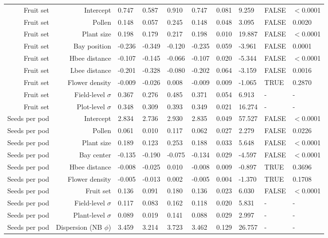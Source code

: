 \begin{landscape}
\begin{longtable}{|r|r|l|l|l|l|l|l|l|l|}
    \hline
    Fruit set & Intercept & 0.747 & 0.587 & 0.910 & 0.747 & 0.081 & 9.259 & FALSE & $<$0.0001 \\ 
    Fruit set & Pollen & 0.148 & 0.057 & 0.245 & 0.148 & 0.048 & 3.095 & FALSE & 0.0020 \\ 
    Fruit set & Plant size & 0.198 & 0.179 & 0.217 & 0.198 & 0.010 & 19.887 & FALSE & $<$0.0001 \\ 
    Fruit set & Bay position & -0.236 & -0.349 & -0.120 & -0.235 & 0.059 & -3.961 & FALSE & 0.0001 \\ 
    Fruit set & Hbee distance & -0.107 & -0.145 & -0.066 & -0.107 & 0.020 & -5.344 & FALSE & $<$0.0001 \\ 
    Fruit set & Lbee distance & -0.201 & -0.328 & -0.080 & -0.202 & 0.064 & -3.159 & FALSE & 0.0016 \\ 
    Fruit set & Flower density & -0.009 & -0.026 & 0.008 & -0.009 & 0.009 & -1.065 & TRUE & 0.2870 \\ 
    Fruit set & Field-level $\sigma$ & 0.367 & 0.276 & 0.485 & 0.371 & 0.054 & 6.913 &  - & -  \\ 
    Fruit set & Plot-level $\sigma$ & 0.348 & 0.309 & 0.393 & 0.349 & 0.021 & 16.274 &  - & -  \\ 
    \hline
    Seeds per pod & Intercept & 2.834 & 2.736 & 2.930 & 2.835 & 0.049 & 57.527 & FALSE & $<$0.0001 \\ 
    Seeds per pod & Pollen & 0.061 & 0.010 & 0.117 & 0.062 & 0.027 & 2.279 & FALSE & 0.0226 \\ 
    Seeds per pod & Plant size & 0.189 & 0.123 & 0.253 & 0.188 & 0.033 & 5.648 & FALSE & $<$0.0001 \\ 
    Seeds per pod & Bay center & -0.135 & -0.190 & -0.075 & -0.134 & 0.029 & -4.597 & FALSE & $<$0.0001 \\ 
    Seeds per pod & Hbee distance & -0.008 & -0.025 & 0.010 & -0.008 & 0.009 & -0.897 & TRUE & 0.3696 \\ 
    Seeds per pod & Flower density & -0.005 & -0.013 & 0.002 & -0.005 & 0.004 & -1.370 & TRUE & 0.1708 \\ 
    Seeds per pod & Fruit set & 0.136 & 0.091 & 0.180 & 0.136 & 0.023 & 6.030 & FALSE & $<$0.0001 \\ 
    Seeds per pod & Field-level $\sigma$ & 0.117 & 0.083 & 0.162 & 0.118 & 0.020 & 5.831 &  - & -  \\ 
    Seeds per pod & Plant-level $\sigma$ & 0.089 & 0.019 & 0.141 & 0.088 & 0.029 & 2.997 &  - & -  \\ 
    Seeds per pod & Dispersion (NB $\phi$) & 3.459 & 3.214 & 3.723 & 3.462 & 0.129 & 26.757 &  - & -  \\ 

\end{longtable}
\end{landscape}

